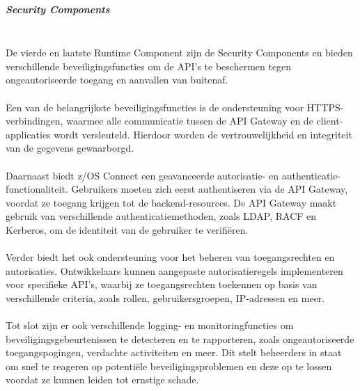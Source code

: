 \subparagraph{Security Components} \mbox{} \\
De vierde en laatste Runtime Component zijn de Security Components en bieden verschillende beveiligingsfuncties om de API's te beschermen tegen ongeautoriseerde toegang en aanvallen van buitenaf. \autocite{IBM2023a}
\\ \\
Een van de belangrijkste beveiligingsfuncties is de ondersteuning voor HTTPS-verbindingen, waarmee alle communicatie tussen de API Gateway en de client-applicaties wordt versleuteld. Hierdoor worden de vertrouwelijkheid en integriteit van de gegevens gewaarborgd. \autocite{IBM2023a}
\\ \\
Daarnaast biedt z/OS Connect een geavanceerde autorisatie- en authenticatie-functionaliteit. Gebruikers moeten zich eerst authentiseren via de API Gateway, voordat ze toegang krijgen tot de backend-resources. De API Gateway maakt gebruik van verschillende authenticatiemethoden, zoals LDAP, RACF en Kerberos, om de identiteit van de gebruiker te verifiëren. \autocite{IBM2023a}
\\ \\
Verder biedt het ook ondersteuning voor het beheren van toegangsrechten en autorisaties. Ontwikkelaars kunnen aangepaste autorisatieregels implementeren voor specifieke API's, waarbij ze toegangsrechten toekennen op basis van verschillende criteria, zoals rollen, gebruikersgroepen, IP-adressen en meer. \autocite{IBM2023a}
\\ \\
Tot slot zijn er ook verschillende logging- en monitoringfuncties om beveiligingsgebeurtenissen te detecteren en te rapporteren, zoals ongeautoriseerde toegangspogingen, verdachte activiteiten en meer. Dit stelt beheerders in staat om snel te reageren op potentiële beveiligingsproblemen en deze op te lossen voordat ze kunnen leiden tot ernstige schade. \autocite{IBM2023a}
\\ \\
